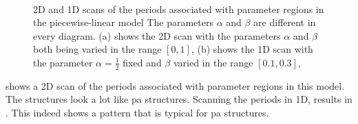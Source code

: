 \begin{figure}
	\centering
	 \\
	\caption[2D and 1D scans of the periods associated with parameter regions in the piecewise-linear model]{
		2D and 1D scans of the periods associated with parameter regions in the piecewise-linear model
		The parameters $\alpha$ and $\beta$ are different in every diagram.
		(a) shows the 2D scan with the parameters $\alpha$ and $\beta$ both being varied in the range $[0, 1]$,
		(b) shows the 1D scan with the parameter $\alpha = \frac{1}{2}$ fixed and $\beta$ varied in the range $[0.1, 0.3]$,
	}
\end{figure}

 shows a 2D scan of the periods associated with parameter regions in this model.
The structures look a lot like \gls{pa} structures.
Scanning the periods in 1D, results in .
This indeed shows a pattern that is typical for \gls{pa} structures.
